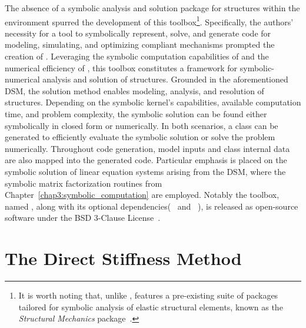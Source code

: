 The absence of a symbolic analysis and solution package for structures within the \Maple{} environment spurred the development of this toolbox\footnote{It is worth noting that, unlike \Maple{}, \Mathematica{} features a pre-existing suite of packages tailored for symbolic analysis of elastic structural elements, known as the \emph{Structural Mechanics} package~\cite{structuralmechanics}.}. Specifically, the authors' necessity for a tool to symbolically represent, solve, and generate code for modeling, simulating, and optimizing compliant mechanisms prompted the creation of \TrussMe{}. Leveraging the symbolic computation capabilities of \Maple{} and the numerical efficiency of \Matlab{}, this toolbox constitutes a framework for symbolic-numerical analysis and solution of structures. Grounded in the aforementioned \ac{DSM}, the solution method enables modeling, analysis, and resolution of structures. Depending on the symbolic kernel's capabilities, available computation time, and problem complexity, the symbolic solution can be found either symbolically in closed form or numerically. In both scenarios, a \Matlab{} class can be generated to efficiently evaluate the symbolic solution or solve the problem numerically. Throughout code generation, model inputs and class internal data are also mapped into the generated code. Particular emphasis is placed on the symbolic solution of linear equation systems arising from the \ac{DSM}, where the symbolic matrix factorization routines from Chapter~\ref{chap3:symbolic_computation} are employed. Notably the toolbox, named \TrussMe{}, along with its optional dependencies(\LEM{}~\cite{lem} and \LAST{}~\cite{last}), is released as open-source software under the \ac{BSD} 3-Clause License~\cite{trussme}.


\section{The Direct Stiffness Method}
\label{app4:sec:solution_method}

